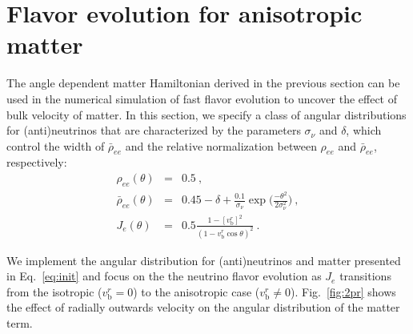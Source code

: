 \documentclass[aps, prd, 10pt, twocolumn, superscriptaddress, noshowpacs, preprintnumbers, longbibliography, groupedaddress, footinbib, bibnotes]{revtex4-1}
\newcommand{\vbr}{v_{\mathrm{b}}^{r}}
\begin{document}
\section{Flavor evolution for anisotropic matter}
\label{sec4}

The angle dependent matter Hamiltonian derived in the previous section can be used in the numerical simulation of fast flavor evolution to uncover the effect of bulk velocity of matter. In this section, we specify a class of angular distributions for (anti)neutrinos that are characterized by the parameters $\sigma_{\nu}$ and $\delta$, which control the width of $\bar{\rho}_{ee}$ and the relative normalization between $\rho_{ee}$ and $\bar{\rho}_{ee}$, respectively:
\begin{eqnarray}
\label{eq:init}
	\rho_{ee}(\theta) &=& 0.5 \ , \nonumber \\
	\bar{\rho}_{ee}(\theta) &=&  0.45 -\delta + \frac{0.1}{\sigma_{\nu}} \exp{\Bigg(\frac{-\theta^2}{2\sigma_{\nu}^2}\Bigg)} \ , \nonumber \\
	J_e(\theta) &=& 0.5 \frac{1-[\vbr]^2}{(1-\vbr\cos{\theta})^2}  \ .
\end{eqnarray}



We implement the angular distribution for (anti)neutrinos and matter presented in Eq.~\ref{eq:init} and focus on the the neutrino flavor evolution as $J_{e}$ transitions from the isotropic ($\vbr=0$) to the anisotropic case ($\vbr \neq 0$). Fig.~\ref{fig:2pr} shows the effect of radially outwards velocity on the angular distribution of the matter term.
\end{document}
